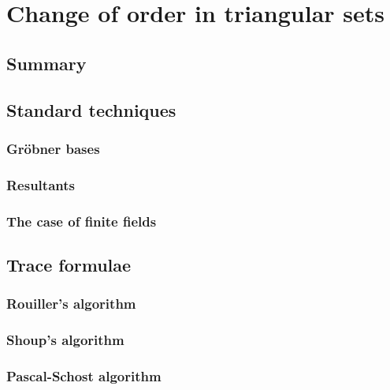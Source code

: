 \newcommand{\AS}[1]{\mathcal{#1}}  %
\newcommand{\biv}[1]{\mathfrak{#1}}  %
\newcommand{\vect}[1]{\vec{#1}}  %
\newcommand{\bs}{\mathbf{s}}  %
\newcommand{\bC}{\mathbf{C}}  %
\newcommand{\bB}{\mathbf{B}}  %
\newcommand{\bD}{\mathbf{D}}  %
\newcommand{\bP}{\mathbf{P}}  %

\newcommand{\sC}{\mathsf{K}}  %
\renewcommand{\L}{\mathsf{L}}  %

\part{Change of order in triangular sets}

\chapter{Summary}


\chapter{Standard techniques}
\section{Gröbner bases}
\section{Resultants}
\section{The case of finite fields}


\chapter{Trace formulae}
\section{Rouiller's algorithm}
\section{Shoup's algorithm}
\section{Pascal-Schost algorithm}

